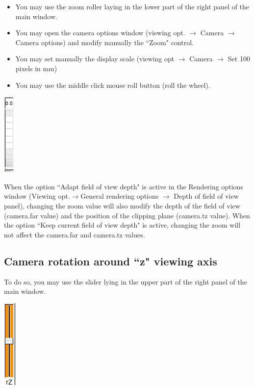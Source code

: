 \begin{minipage}{0.7\textwidth}
\begin{itemize}
\item You may use the zoom roller laying in the lower part of the right panel of the main window.
\item	You may open the camera options window (viewing opt. $\rightarrow$  Camera $\rightarrow$ Camera options) and modify manually the ``Zoom" control.
\item	You may set manually the display scale (viewing opt $\rightarrow$ Camera $\rightarrow$ Set 100 pixels in mm)
\item	You may use the middle click mouse roll button (roll the wheel).
\end{itemize}
\end{minipage}    
\begin{minipage}{0.25\textwidth}\centering
  \includegraphics[scale=0.5]{images/Icons/zoom_01.png}
 \end{minipage}    


When the option ``Adapt field of view depth" is active in the Rendering options window (Viewing opt.$\rightarrow$General rendering options $\rightarrow$ Depth of field of view panel), changing the zoom value will also modify the depth of the field of view (camera.far value) and the position of the clipping plane (camera.tz value). When the option ``Keep current field of view depth" is active, changing the zoom will not affect the camera.far and camera.tz values.

\subsection{Camera rotation around ``z" viewing axis}

\begin{minipage}{0.7\textwidth}
To do so, you may use the slider lying in the upper part of the right panel of the main window.
\end{minipage}    
\begin{minipage}{0.25\textwidth}\centering
  \includegraphics[scale=0.5]{images/Icons/Rotation_z.png}
 \end{minipage}    



